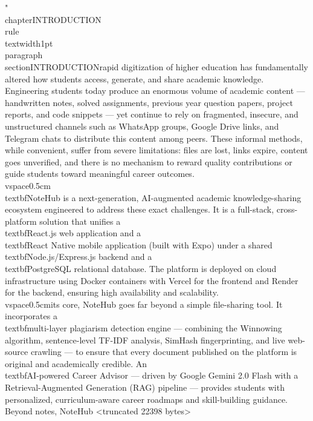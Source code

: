 "\\chapter{INTRODUCTION}\n\\rule{\\textwidth}{1pt}\n\\paragraph{}\n\\section{INTRODUCTION}\n\nThe rapid digitization of higher education has fundamentally altered how students access, generate, and share academic knowledge. Engineering students today produce an enormous volume of academic content --- handwritten notes, solved assignments, previous year question papers, project reports, and code snippets --- yet continue to rely on fragmented, insecure, and unstructured channels such as WhatsApp groups, Google Drive links, and Telegram chats to distribute this content among peers. These informal methods, while convenient, suffer from severe limitations: files are lost, links expire, content goes unverified, and there is no mechanism to reward quality contributions or guide students toward meaningful career outcomes.\n\\vspace{0.5cm}\n\n\\textbf{NoteHub} is a next-generation, AI-augmented academic knowledge-sharing ecosystem engineered to address these exact challenges. It is a full-stack, cross-platform solution that unifies a \\textbf{React.js web application} and a \\textbf{React Native mobile application} (built with Expo) under a shared \\textbf{Node.js/Express.js} backend and a \\textbf{PostgreSQL} relational database. The platform is deployed on cloud infrastructure using Docker containers with Vercel for the frontend and Render for the backend, ensuring high availability and scalability.\n\\vspace{0.5cm}\n\nAt its core, NoteHub goes far beyond a simple file-sharing tool. It incorporates a \\textbf{multi-layer plagiarism detection engine} --- combining the Winnowing algorithm, sentence-level TF-IDF analysis, SimHash fingerprinting, and live web-source crawling --- to ensure that every document published on the platform is original and academically credible. An \\textbf{AI-powered Career Advisor} --- driven by Google Gemini 2.0 Flash with a Retrieval-Augmented Generation (RAG) pipeline --- provides students with personalized, curriculum-aware career roadmaps and skill-building guidance. Beyond notes, NoteHub 
<truncated 22398 bytes>